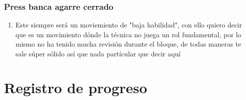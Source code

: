 \documentclass[11pt]{article}
\begin{document}
\subsubsection{Press banca agarre cerrado}
\label{sec:orgea3bac0}
\begin{enumerate}
\item Este siempre será un moviemiento de "baja habilidad", con ello
quiero decir que es un movimiento dónde la técnica no juega un rol
fundamental, por lo mismo no ha tenido mucha revisión durante el
bloque, de todas maneras te sale súper sólido así que nada
partícular que decir aquí
\end{enumerate}
\section{Registro de progreso}
\label{sec:org2f7a8ba}
\end{document}
